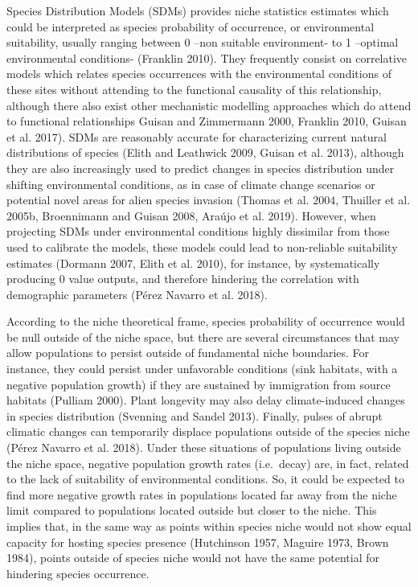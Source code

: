 \documentclass[11pt,twoside]{reedthesis}
\begin{document}
Species Distribution Models (SDMs) provides niche statistics estimates
which could be interpreted as species probability of occurrence, or
environmental suitability, usually ranging between 0 --non suitable
environment- to 1 --optimal environmental conditions- (Franklin 2010).
They frequently consist on correlative models which relates species
occurrences with the environmental conditions of these sites without
attending to the functional causality of this relationship, although
there also exist other mechanistic modelling approaches which do attend
to functional relationships Guisan and Zimmermann 2000, Franklin 2010,
Guisan et al. 2017). SDMs are reasonably accurate for characterizing
current natural distributions of species (Elith and Leathwick 2009,
Guisan et al. 2013), although they are also increasingly used to predict
changes in species distribution under shifting environmental conditions,
as in case of climate change scenarios or potential novel areas for
alien species invasion (Thomas et al. 2004, Thuiller et al. 2005b,
Broennimann and Guisan 2008, Araújo et al. 2019). However, when
projecting SDMs under environmental conditions highly dissimilar from
those used to calibrate the models, these models could lead to
non-reliable suitability estimates (Dormann 2007, Elith et al. 2010),
for instance, by systematically producing 0 value outputs, and therefore
hindering the correlation with demographic parameters (Pérez Navarro et
al. 2018).\par

According to the niche theoretical frame, species probability of
occurrence would be null outside of the niche space, but there are
several circumstances that may allow populations to persist outside of
fundamental niche boundaries. For instance, they could persist under
unfavorable conditions (sink habitats, with a negative population
growth) if they are sustained by immigration from source habitats
(Pulliam 2000). Plant longevity may also delay climate-induced changes
in species distribution (Svenning and Sandel 2013). Finally, pulses of
abrupt climatic changes can temporarily displace populations outside of
the species niche (Pérez Navarro et al. 2018). Under these situations of
populations living outside the niche space, negative population growth
rates (i.e.~decay) are, in fact, related to the lack of suitability of
environmental conditions. So, it could be expected to find more negative
growth rates in populations located far away from the niche limit
compared to populations located outside but closer to the niche. This
implies that, in the same way as points within species niche would not
show equal capacity for hosting species presence (Hutchinson 1957,
Maguire 1973, Brown 1984), points outside of species niche would not
have the same potential for hindering species occurrence.\par
\end{document}
